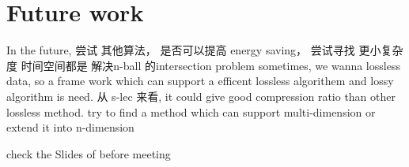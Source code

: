 
\section{Future work}

In the future, 
尝试 其他算法， 是否可以提高 energy saving， 尝试寻找 更小复杂度 时间空间都是 解决n-ball 的intersection problem
sometimes, we wanna lossless data, so a frame work which can support a efficent lossless algorithem and lossy algorithm is need. 
从 s-lec 来看, it could give good compression ratio than other lossless method.
try to find a method which can support multi-dimension or extend it into n-dimension

check the Slides of before meeting 
